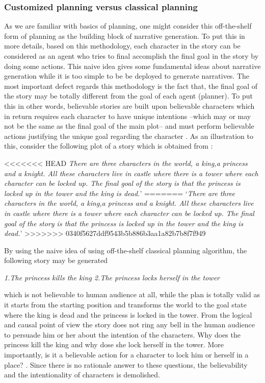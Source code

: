 \documentclass[english]{tktltiki}
\begin{document}
\subsubsection{Customized planning versus classical planning }
As we are familiar with basics of planning, one might consider this off-the-shelf form of planning as the building block of narrative generation. To put this in more details, based on this methodology, each character in the story can be considered as an agent who tries to final accomplish the final goal in the story by doing some actions. This naive idea gives some fundamental ideas about narrative generation while it is too simple to be be deployed to generate narratives.
The most important defect regards this methodology is the fact that, the final goal of the story may be totally different from the goal of each agent (planner). To put this in other words, believable stories are built upon believable characters which in return requires each character to have unique intentions --which may or may not be the same as the final goal of the main plot-- and must perform believable actions justifying the unique goal regarding the character \cite{planning:2010:NPB:1946417.1946422}. As an illustration to this, consider the following plot of a story which is obtained from \cite{planning:2010:NPB:1946417.1946422}:
\begin{flushleft}
<<<<<<< HEAD
\textit{There are three characters in the world, a king,a princess and a knight. All these characters live in castle where there is a tower where each character can be locked up. The final goal of the story is that the princess is locked up in the tower and the king is dead.}'
=======
`\textit{There are three characters in the world, a king,a princess and a knight. All these characters live in castle where there is a tower where each character can be locked up. The final goal of the story is that the princess is locked up in the tower and the king is dead.}'
>>>>>>> 0340f5627ddf9543b5b886b3aa1a82b7b8f7f949
\end{flushleft}
By using the naive idea of using off-the-shelf classical planning algorithm, the following story may be generated
\begin{flushleft}
\textit{1.The princess kills the king \newline 2.The princess locks herself in the tower}
\end{flushleft}
which is not believable to human audience at all, while the plan is totally valid as it starts from the starting position and transforms the world to the goal state where the king is dead and the princess is locked in the tower. From the logical and causal point of view the story does not ring any bell in the human audience to persuade him or her about the intention of the characters. Why does the princess kill the king and why dose she lock herself in the tower. More importantly, is it a believable action for a character to lock him or herself in a place? . Since there is no rationale answer to these questions, the believability and the intentionality of characters is demolished.
\end{document}
